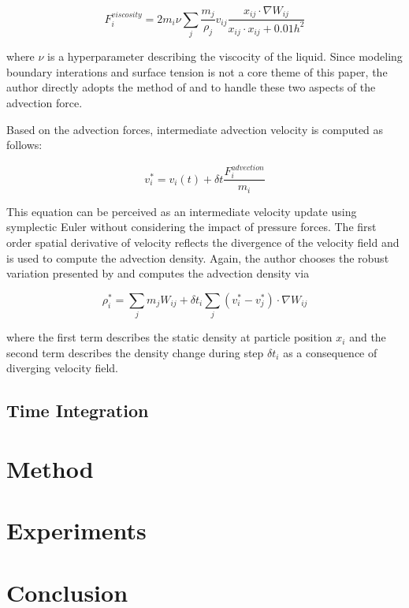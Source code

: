 \documentclass[
	11pt, 
	DIV10,
	ngerman,
	a4paper, 
	oneside, 
	headings=normal, 
	captions=tableheading,
	final, 
	numbers=noenddot
]{scrartcl}
\begin{document}
\begin{equation}
	\label{equa:2}
	F_{i}^{viscosity} = 2m_{i}\nu \sum_{j}\frac{m_{j}}{\rho_{j}}v_{ij}\frac{x_{ij} \cdot \nabla W_{ij}}{x_{ij}\cdot x_{ij} + 0.01h^{2}}
\end{equation}

where $ \nu $ is a hyperparameter describing the viscocity of the liquid. Since modeling boundary interations and surface tension is not a core theme of this paper, the author directly adopts the method of \cite{akinci2012versatile} and \cite{huber2015evaluation} to handle these two aspects of the advection force.
\par
Based on the advection forces, intermediate advection velocity is computed as follows:

\begin{equation}
	\label{equa:3}
	v_{i}^{*} = v_{i}(t) + \delta t\frac{F_{i}^{advection}}{m_{i}}
\end{equation}

This equation can be perceived as an intermediate velocity update using symplectic Euler without considering the impact of pressure forces. The first order spatial derivative of velocity reflects the divergence of the velocity field and is used to compute the advection density. Again, the author chooses the robust variation presented by \cite{monaghan1992smoothed} and computes the advection density via

\begin{equation}
	\label{equa:4}
	\rho_{i}^{*} = \sum_{j}m_{j}W_{ij} + \delta t_{i}\sum_{j}(v_{i}^{*} - v_{j}^{*})\cdot \nabla W_{ij}
\end{equation}

where the first term describes the static density at particle position $ x_{i} $ and the second term describes the density change during step $ \delta t_{i} $ as a consequence of diverging velocity field.
\par


\subsection{Time Integration}

\section{Method}

\section{Experiments}

\section{Conclusion}



\end{document}
